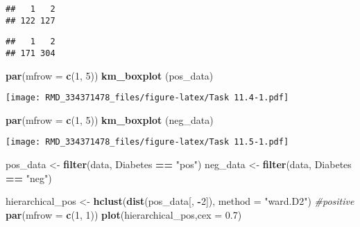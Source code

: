 \documentclass[
]{article}
\newenvironment{Shaded}{\begin{snugshade}}{\end{snugshade}}
\newcommand{\AttributeTok}[1]{\textcolor[rgb]{0.13,0.29,0.53}{#1}}
\newcommand{\CommentTok}[1]{\textcolor[rgb]{0.56,0.35,0.01}{\textit{#1}}}
\newcommand{\DecValTok}[1]{\textcolor[rgb]{0.00,0.00,0.81}{#1}}
\newcommand{\FloatTok}[1]{\textcolor[rgb]{0.00,0.00,0.81}{#1}}
\newcommand{\FunctionTok}[1]{\textcolor[rgb]{0.13,0.29,0.53}{\textbf{#1}}}
\newcommand{\NormalTok}[1]{#1}
\newcommand{\OtherTok}[1]{\textcolor[rgb]{0.56,0.35,0.01}{#1}}
\newcommand{\SpecialCharTok}[1]{\textcolor[rgb]{0.81,0.36,0.00}{\textbf{#1}}}
\newcommand{\StringTok}[1]{\textcolor[rgb]{0.31,0.60,0.02}{#1}}
\begin{document}
\begin{verbatim}
##   1   2 
## 122 127
\end{verbatim}

\begin{Shaded}
\end{Shaded}

\begin{verbatim}
##   1   2 
## 171 304
\end{verbatim}

\begin{Shaded}
\begin{Highlighting}[]
\FunctionTok{par}\NormalTok{(}\AttributeTok{mfrow =} \FunctionTok{c}\NormalTok{(}\DecValTok{1}\NormalTok{, }\DecValTok{5}\NormalTok{))}
\FunctionTok{km\_boxplot}\NormalTok{ (pos\_data)}
\end{Highlighting}
\end{Shaded}

\texttt{[image: RMD\_334371478\_files/figure-latex/Task 11.4-1.pdf]}

\begin{Shaded}
\begin{Highlighting}[]
\FunctionTok{par}\NormalTok{(}\AttributeTok{mfrow =} \FunctionTok{c}\NormalTok{(}\DecValTok{1}\NormalTok{, }\DecValTok{5}\NormalTok{))}
\FunctionTok{km\_boxplot}\NormalTok{ (neg\_data)}
\end{Highlighting}
\end{Shaded}

\texttt{[image: RMD\_334371478\_files/figure-latex/Task 11.5-1.pdf]}

\begin{Shaded}
\begin{Highlighting}[]
\NormalTok{pos\_data }\OtherTok{\textless{}{-}} \FunctionTok{filter}\NormalTok{(data, Diabetes }\SpecialCharTok{==} \StringTok{"pos"}\NormalTok{)}
\NormalTok{neg\_data }\OtherTok{\textless{}{-}} \FunctionTok{filter}\NormalTok{(data, Diabetes }\SpecialCharTok{==} \StringTok{"neg"}\NormalTok{)}

\NormalTok{hierarchical\_pos }\OtherTok{\textless{}{-}} \FunctionTok{hclust}\NormalTok{(}\FunctionTok{dist}\NormalTok{(pos\_data[, }\SpecialCharTok{{-}}\DecValTok{2}\NormalTok{]), }\AttributeTok{method =} \StringTok{"ward.D2"}\NormalTok{) }\CommentTok{\#positive}
\FunctionTok{par}\NormalTok{(}\AttributeTok{mfrow =} \FunctionTok{c}\NormalTok{(}\DecValTok{1}\NormalTok{, }\DecValTok{1}\NormalTok{))}
\FunctionTok{plot}\NormalTok{(hierarchical\_pos,}\AttributeTok{cex =} \FloatTok{0.7}\NormalTok{) }
\end{Highlighting}
\end{Shaded}
\end{document}
